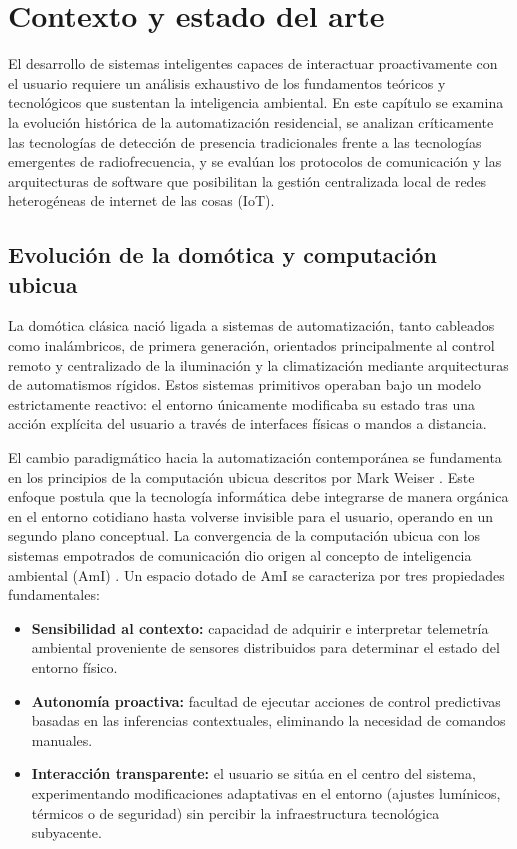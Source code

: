 \newpage
\section{Contexto y estado del arte}
\label{cap:contexto_estado_arte}

El desarrollo de sistemas inteligentes capaces de interactuar proactivamente con el usuario requiere un análisis exhaustivo de los fundamentos teóricos y tecnológicos que sustentan la inteligencia ambiental. En este capítulo se examina la evolución histórica de la automatización residencial, se analizan críticamente las tecnologías de detección de presencia tradicionales frente a las tecnologías emergentes de radiofrecuencia, y se evalúan los protocolos de comunicación y las arquitecturas de software que posibilitan la gestión centralizada local de redes heterogéneas de internet de las cosas (IoT).

\subsection{Evolución de la domótica y computación ubicua}
La domótica clásica nació ligada a sistemas de automatización, tanto cableados como inalámbricos, de primera generación, orientados principalmente al control remoto y centralizado de la iluminación y la climatización mediante arquitecturas de automatismos rígidos. Estos sistemas primitivos operaban bajo un modelo estrictamente reactivo: el entorno únicamente modificaba su estado tras una acción explícita del usuario a través de interfaces físicas o mandos a distancia.

El cambio paradigmático hacia la automatización contemporánea se fundamenta en los principios de la computación ubicua descritos por Mark Weiser \cite{weiser1991computer}. Este enfoque postula que la tecnología informática debe integrarse de manera orgánica en el entorno cotidiano hasta volverse invisible para el usuario, operando en un segundo plano conceptual. La convergencia de la computación ubicua con los sistemas empotrados de comunicación dio origen al concepto de inteligencia ambiental (AmI) \cite{cook2009ambient}. Un espacio dotado de AmI se caracteriza por tres propiedades fundamentales:
\begin{itemize}
    \item \textbf{Sensibilidad al contexto:} capacidad de adquirir e interpretar telemetría ambiental proveniente de sensores distribuidos para determinar el estado del entorno físico.
    \item \textbf{Autonomía proactiva:} facultad de ejecutar acciones de control predictivas basadas en las inferencias contextuales, eliminando la necesidad de comandos manuales.
    \item \textbf{Interacción transparente:} el usuario se sitúa en el centro del sistema, experimentando modificaciones adaptativas en el entorno (ajustes lumínicos, térmicos o de seguridad) sin percibir la infraestructura tecnológica subyacente.
\end{itemize}

